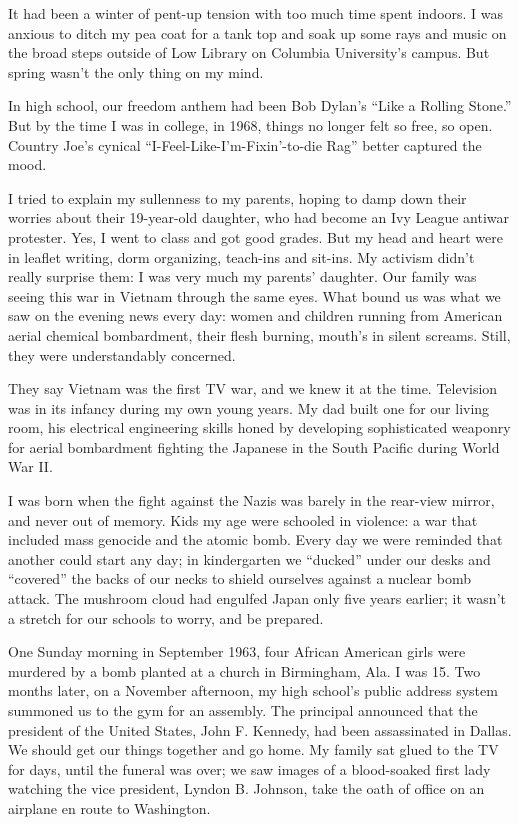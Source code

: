 It had been a winter of pent-up tension with too much time spent
indoors. I was anxious to ditch my pea coat for a tank top and soak up
some rays and music on the broad steps outside of Low Library on
Columbia University's campus. But spring wasn't the only thing on my
mind.

In high school, our freedom anthem had been Bob Dylan's ``Like a Rolling
Stone.'' But by the time I was in college, in 1968, things no longer
felt so free, so open. Country Joe's cynical
``I-Feel-Like-I'm-Fixin'-to-die Rag'' better captured the mood.

I tried to explain my sullenness to my parents, hoping to damp down
their worries about their 19-year-old daughter, who had become an Ivy
League antiwar protester. Yes, I went to class and got good grades. But
my head and heart were in leaflet writing, dorm organizing, teach-ins
and sit-ins. My activism didn't really surprise them: I was very much my
parents' daughter. Our family was seeing this war in Vietnam through the
same eyes. What bound us was what we saw on the evening news every day:
women and children running from American aerial chemical bombardment,
their flesh burning, mouth's in silent screams. Still, they were
understandably concerned.

They say Vietnam was the first TV war, and we knew it at the time.
Television was in its infancy during my own young years. My dad built
one for our living room, his electrical engineering skills honed by
developing sophisticated weaponry for aerial bombardment fighting the
Japanese in the South Pacific during World War II.

I was born when the fight against the Nazis was barely in the rear-view
mirror, and never out of memory. Kids my age were schooled in violence:
a war that included mass genocide and the atomic bomb. Every day we were
reminded that another could start any day; in kindergarten we ``ducked''
under our desks and ``covered'' the backs of our necks to shield
ourselves against a nuclear bomb attack. The mushroom cloud had engulfed
Japan only five years earlier; it wasn't a stretch for our schools to
worry, and be prepared.

One Sunday morning in September 1963, four African American girls were
murdered by a bomb planted at a church in Birmingham, Ala. I was 15. Two
months later, on a November afternoon, my high school's public address
system summoned us to the gym for an assembly. The principal announced
that the president of the United States, John F. Kennedy, had been
assassinated in Dallas. We should get our things together and go home.
My family sat glued to the TV for days, until the funeral was over; we
saw images of a blood-soaked first lady watching the vice president,
Lyndon B. Johnson, take the oath of office on an airplane en route to
Washington.

